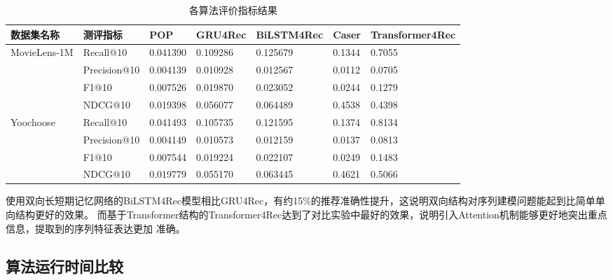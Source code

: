 \begin{table}[]
\centering
\caption{各算法评价指标结果}
\label{table:result}
  \begin{tabular}{@{}lllllll@{}}
  \toprule
  数据集名称                     & 测评指标      & POP      & GRU4Rec  & \textbf{BiLSTM4Rec} & Caser & \textbf{Transformer4Rec} \\ \midrule
  \multirow{4}{*}{MovieLens-1M} & Recall@10    & 0.041390 & 0.109286 & 0.125679 & 0.1344 & 0.7055      \\
                                & Precision@10 & 0.004139 & 0.010928 & 0.012567 & 0.0112 & 0.0705      \\
                                & F1@10        & 0.007526 & 0.019870 & 0.023052 & 0.0244 & 0.1279      \\
                                & NDCG@10      & 0.019398 & 0.056077 & 0.064489 & 0.4538 & 0.4398      \\
  \multirow{4}{*}{Yoochoose}    & Recall@10    & 0.041493 & 0.105735 & 0.121595 & 0.1374 & 0.8134      \\
                                & Precision@10 & 0.004149 & 0.010573 & 0.012159 & 0.0137 & 0.0813      \\
                                & F1@10        & 0.007544 & 0.019224 & 0.022107 & 0.0249 & 0.1483      \\
                                & NDCG@10      & 0.019779 & 0.055170 & 0.063445 & 0.4621 & 0.5066      \\ \cmidrule(l){2-7} 
  \end{tabular}
\end{table}
使用双向长短期记忆网络的BiLSTM4Rec模型相比GRU4Rec，有约15\%的推荐准确性提升，这说明双向结构对序列建模问题能起到比简单单向结构更好的效果。
而基于Transformer结构的Transformer4Rec达到了对比实验中最好的效果，说明引入Attention机制能够更好地突出重点信息，提取到的序列特征表达更加
准确。

\subsection{算法运行时间比较}

